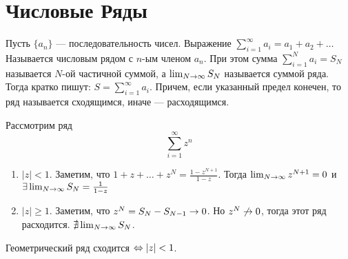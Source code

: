 
\section{Числовые Ряды}
\begin{definition}
    Пусть \(\{a_n\}\) --- последовательность чисел. Выражение \(\sum_{i = 1}^{\infty} a_i = a_1 + a_2 + \dots \) Называется числовым рядом с \(n\)-ым членом \(a_n\). При этом сумма \(\sum_{i = 1}^N a_i = S_N\) называется \(N\)-ой частичной суммой, а \(\lim_{N\rightarrow\infty}S_N\) называется суммой ряда. Тогда кратко пишут: \(S = \sum_{i = 1}^\infty a_i\). Причем, если указанный предел конечен, то ряд называется сходящимся, иначе --- расходящимся.
\end{definition}

\begin{example}
    Рассмотрим ряд 
    \[\sum_{i = 1}^{\infty}z^n\]
    \begin{enumerate}
        \item \(|z| < 1\). Заметим, что \(1 + z + \dots + z^N = \frac{1 - z^{N+1}}{1 - z}\). Тогда \(\lim_{N\rightarrow\infty}z^{N+1} = 0\) и \(\exists\lim_{N\rightarrow\infty}S_N = \frac{1}{1 - z}\)
        \item \(|z| \ge 1\). Заметим, что \(z^N = S_{N} - S_{N - 1} \rightarrow 0\). Но \(z^N \not\rightarrow 0\), тогда этот ряд расходится. \(\nexists\lim_{N\rightarrow\infty}S_N\). 
    \end{enumerate}
\end{example}
\begin{note}
    Геометрический ряд сходится \(\Leftrightarrow |z| < 1\).
\end{note}

